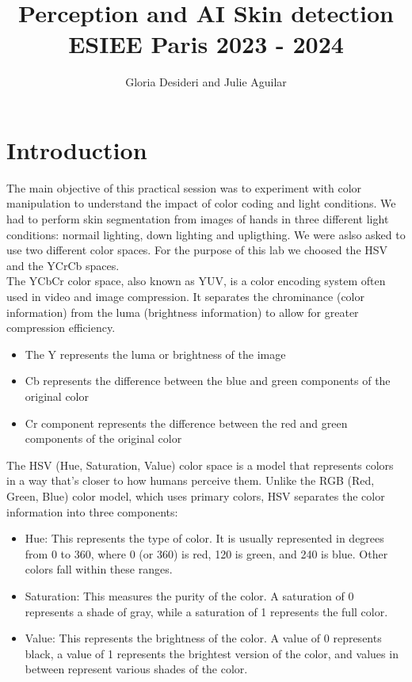 \documentclass{report}
\title{\Huge{Perception and AI Skin detection}\\ ESIEE Paris 2023 - 2024}
\author{\huge{Gloria Desideri and Julie  Aguilar}}
\date{}
\begin{document}
\maketitle
\newpage%
\tableofcontents
\pagebreak

\chapter{Introduction}
The main objective of this practical session was to experiment with color manipulation
to understand the impact of color coding and light conditions. We had to perform
skin segmentation from images of hands in three different light conditions: normail lighting,
down lighting and upligthing. We were aslso asked to use two different color spaces. For 
the purpose of this lab we choosed the HSV and the YCrCb spaces.\\
The YCbCr color space, also known as YUV, is a color encoding system often used in video and image compression. It separates the chrominance (color information) from the luma (brightness information) to allow for greater compression efficiency.
\begin{itemize}
  \item The Y represents the luma or brightness of the image
  \item Cb represents the difference between the blue and green components of the original color
  \item Cr component represents the difference between the red and green components of the original color
\end{itemize}
The HSV (Hue, Saturation, Value) color space is a model that represents colors in a way that's closer to how humans perceive them. Unlike the RGB (Red, Green, Blue) color model, which uses primary colors, HSV separates the color information into three components:
\begin{itemize}
  \item Hue: This represents the type of color. It is usually represented in degrees from 0 to 360, where 0 (or 360) is red, 120 is green, and 240 is blue. Other colors fall within these ranges. 
  \item Saturation: This measures the purity of the color. A saturation of 0 represents a shade of gray, while a saturation of 1 represents the full color.
  \item Value: This represents the brightness of the color. A value of 0 represents black, a value of 1 represents the brightest version of the color, and values in between represent various shades of the color.
\end{itemize}
\end{document}
